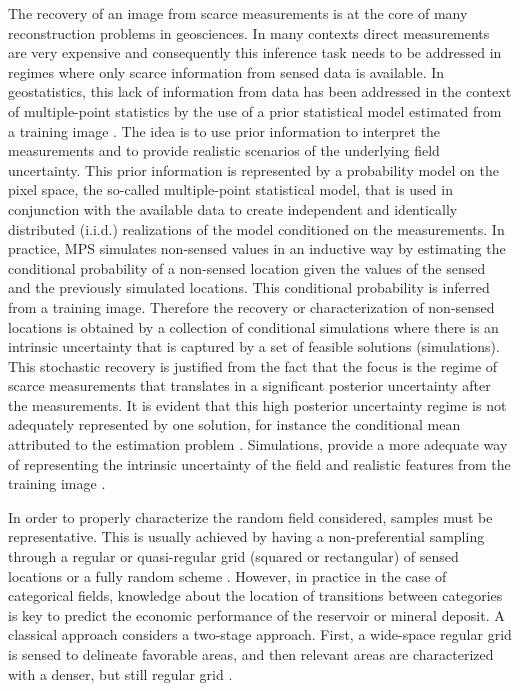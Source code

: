 The recovery of an image from scarce measurements is at the core of many reconstruction problems in geosciences. In many contexts direct measurements are very expensive and consequently this inference task needs to be addressed in regimes where only scarce information from sensed data is available. In geostatistics, this lack of information from data has been addressed in the context of multiple-point statistics by the use of a prior statistical model estimated from a training image \citep{Mariethoz_2014_a,guardiano_1993,strebelle_2002,arpat_2007,wu_2008,Ortiz_2004_a}. The idea is to use prior information to interpret the measurements and to provide realistic scenarios of the underlying field uncertainty.  This prior information is represented by a probability model on the pixel space, the so-called multiple-point statistical model, that is used in conjunction with the available data to create independent and identically distributed (i.i.d.) realizations of the model conditioned on the measurements. In practice, MPS simulates non-sensed values in an inductive way by estimating the conditional probability of a non-sensed location given the values of the sensed and the previously simulated locations. This conditional probability is inferred from a training image. Therefore the recovery or characterization of non-sensed locations is obtained by a collection of conditional simulations where there is an intrinsic uncertainty that is captured by a set of feasible solutions (simulations). This stochastic recovery is justified from the fact that the focus is the regime of scarce measurements that translates in a significant posterior uncertainty after the measurements. It is evident that this high posterior uncertainty regime is not adequately represented by one solution, for instance the conditional mean attributed to the estimation problem \citep{gray_2004}. Simulations, provide a more adequate way of representing the intrinsic uncertainty of the field and realistic features from the training image \citep{Mariethoz_2014_a}.

In order to properly characterize the random field considered, samples must be representative. This is usually achieved by having a non-preferential sampling through a regular or quasi-regular grid (squared or rectangular) of sensed locations \citep{rossideutsch2014} or a fully random scheme \citep{wellmer1998}. However, in practice in the case of categorical fields, knowledge about the location of transitions between categories is key to predict the economic performance of the reservoir or mineral deposit. A classical approach considers a two-stage approach. First, a wide-space regular grid is sensed to delineate favorable areas, and then relevant areas are characterized with a denser, but still regular grid \citep{kennedy1990}. 

